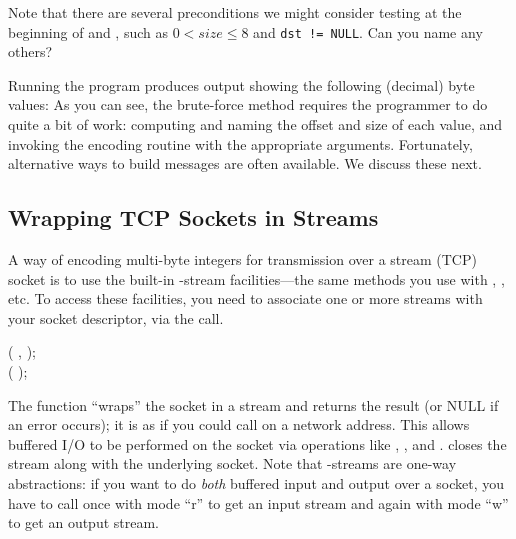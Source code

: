 Note that there are several preconditions we might
consider testing at the beginning of  and
, such as $0 < size \leq 8$ and
\verb+dst != NULL+.  Can you name any others?  


Running the program produces output
showing the following (decimal) byte values:
%
As you can see, the brute-force method requires the programmer to
do quite a bit of work: computing and naming
the offset and size of each value, and invoking the encoding routine
with the appropriate arguments. 
%
Fortunately, alternative ways to build messages are often available.
We discuss these next.


\subsection{Wrapping TCP Sockets in Streams}
\label{sect:streams}

A way of encoding multi-byte integers for transmission
over a stream (TCP) socket is to use the built-in
-stream facilities---the same methods you use with
, , etc.  To access these facilities, you need
to associate one or more  streams with your socket
descriptor, via the  call.

\begin{inlinefcn}
 ( , 
           );\\
 ( );
\end{inlinefcn}

The  function ``wraps'' the socket in a stream and
returns the result (or NULL if an error occurs); it is as if you could
call  on a network address.
This allows buffered I/O to be performed on the socket via operations like 
, ,  and .
 closes the stream along with the underlying socket.
Note that -streams are one-way abstractions: if you want to do
\emph{both\/} buffered input and output over a socket, you have to call
 once with mode ``r''
to get an input stream and again with mode ``w'' to get an
output stream. 

